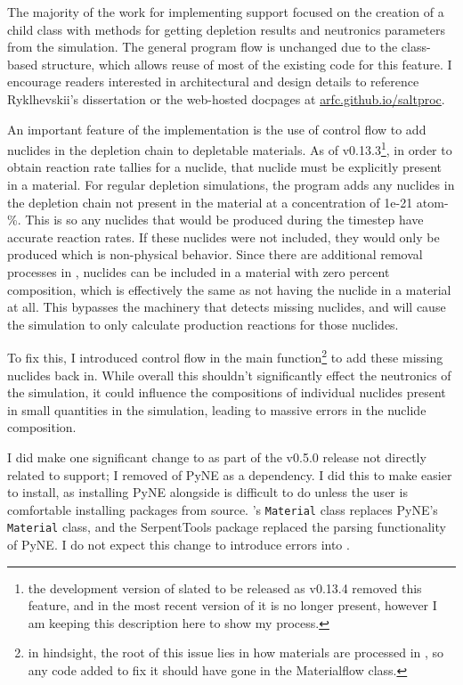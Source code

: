 The majority of the work for implementing \OpenMC support focused on the
creation of a child class with methods for getting depletion results and
neutronics parameters from the \OpenMC simulation. The general program
flow is unchanged due to the class-based structure, which allows reuse of most
of the existing code for this feature. I encourage readers interested in
architectural and design details to reference Ryklhevskii's dissertation
\cite{rykhlevskii_fuel_2020} or the web-hosted \SaltProc docpages at
\url{arfc.github.io/saltproc}.

An important feature of the \OpenMC implementation is the use of control flow
to add nuclides in the depletion chain to depletable materials. As of \OpenMC
v0.13.3\footnote{the development version of \OpenMC slated to be released
as v0.13.4 removed this feature, and in the most recent version of \SaltProc
it is no longer present, however I am keeping this description here to
show my process.}, in order to obtain reaction rate tallies for a nuclide, that nuclide
must be explicitly present in a material. For regular \OpenMC depletion
simulations, the program adds any nuclides in the depletion chain not present
in the material at a concentration of 1e-21 atom-\%. This is so any nuclides
that would be produced during the timestep have accurate reaction rates. If
these nuclides were not included, they would only be produced which is
non-physical behavior. Since there are additional removal processes in
\SaltProc, nuclides can be included in a material with zero percent composition,
which is effectively the same as not having the nuclide in a material at all. This
bypasses the \OpenMC machinery that detects missing nuclides, and will cause
the simulation to only calculate production reactions for those nuclides.

To fix this, I introduced control flow in the main function\footnote{in hindsight,
the root of this issue lies in how materials are processed in \SaltProc, so any code
added to fix it should have gone in the Materialflow class.}
to add these missing nuclides back in. While overall this shouldn't
significantly effect the neutronics of the simulation, it could influence the
compositions of individual nuclides present in small quantities in the
simulation, leading to massive errors in the nuclide composition.%


I did make one significant change to \SaltProc as part of the v0.5.0 release
not directly related to \OpenMC support; I removed of PyNE as a dependency.
I did this to make \SaltProc easier to install, as installing PyNE alongside
\OpenMC is difficult to do unless the user is comfortable installing packages
from source. \OpenMC's \verb.Material. class replaces PyNE's \verb.Material.
class, and the SerpentTools package replaced the \SerpentTWO parsing
functionality of PyNE. I do not expect this change to introduce errors into
\SaltProc.

